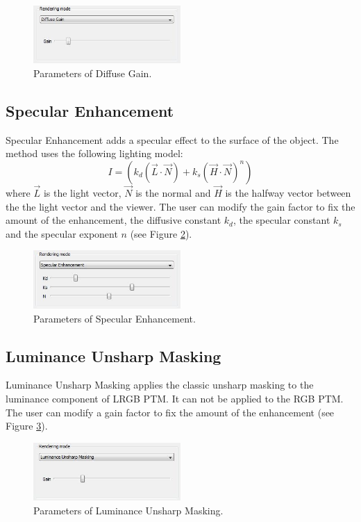 \documentclass[oneside, 11pt]{book}
\begin{document}
\begin{figure}[hbt]
  \centering
  \includegraphics[width=0.5\textwidth]{diffuse_gain}
  \caption{Parameters of Diffuse Gain.}
  \label{fig:diffuseGain}
\end{figure}

\subsection{Specular Enhancement}
Specular Enhancement adds a specular effect to the surface of the object. The method uses the following lighting model:
\begin{equation}
    I = (k_{d} (\vec{L} \cdot \vec{N}) + k_{s} (\vec{H} \cdot \vec{N})^{n})
\end{equation}
where $\vec{L}$ is the light vector, $\vec{N}$ is the normal and $\vec{H}$ is the halfway vector between the the light vector and the viewer. The user can modify the gain factor to fix the amount of the enhancement, the diffusive constant $k_{d}$, the specular constant $k_{s}$ and the specular exponent $n$ (see Figure \ref{fig:specularEnh}).

\begin{figure}[hbt]
  \centering
  \includegraphics[width=0.5\textwidth]{specular_enh}
  \caption{Parameters of Specular Enhancement.}
  \label{fig:specularEnh}
\end{figure}

\subsection{Luminance Unsharp Masking}
Luminance Unsharp Masking applies the classic unsharp masking to the luminance component of LRGB PTM. It can not be applied to the RGB PTM. The user can modify a gain factor to fix the amount of the enhancement (see Figure \ref{fig:luminanceUM}).

\begin{figure}[hbt]
  \centering
  \includegraphics[width=0.5\textwidth]{luminance_um}
  \caption{Parameters of Luminance Unsharp Masking.}
  \label{fig:luminanceUM}
\end{figure}
\end{document}
